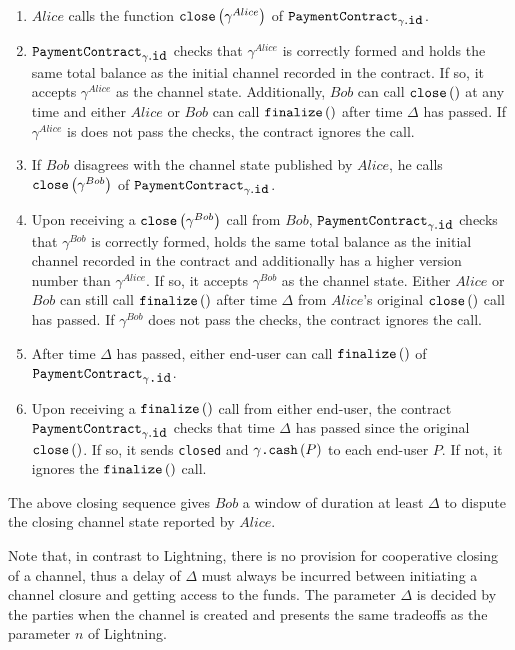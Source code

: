   \begin{enumerate}
    \item $Alice$ calls the function $\mbox{\texttt{close}}\left(\gamma^{Alice}\right)$ of
    $\mbox{\texttt{PaymentContract}}_{\gamma\mbox{.\texttt{id}}}$.
    \item $\mbox{\texttt{PaymentContract}}_{\gamma\mbox{.\texttt{id}}}$ checks that
    $\gamma^{Alice}$ is correctly formed and holds the same total balance as the initial
    channel recorded in the contract. If so, it accepts $\gamma^{Alice}$ as the channel
    state. Additionally, $Bob$ can call $\mbox{\texttt{close}}\left(\right)$ at any time
    and either $Alice$ or $Bob$ can call $\mbox{\texttt{finalize}}\left(\right)$ after
    time $\Delta$ has passed. If $\gamma^{Alice}$ is does not pass the checks, the
    contract ignores the call.
    \item If $Bob$ disagrees with the channel state published by $Alice$, he calls
    $\mbox{\texttt{close}}\left(\gamma^{Bob}\right)$ of
    $\mbox{\texttt{PaymentContract}}_{\gamma\mbox{.\texttt{id}}}$.
    \item Upon receiving a $\mbox{\texttt{close}}\left(\gamma^{Bob}\right)$ call from
    $Bob$, $\mbox{\texttt{PaymentContract}}_{\gamma\mbox{.\texttt{id}}}$ checks that
    $\gamma^{Bob}$ is correctly formed, holds the same total balance as the initial
    channel recorded in the contract and additionally has a higher version number than
    $\gamma^{Alice}$. If so, it accepts $\gamma^{Bob}$ as the channel state. Either
    $Alice$ or $Bob$ can still call $\mbox{\texttt{finalize}}\left(\right)$ after time
    $\Delta$ from $Alice$'s original $\mbox{\texttt{close}}\left(\right)$ call has passed.
    If $\gamma^{Bob}$ does not pass the checks, the contract ignores the call.
    \item After time $\Delta$ has passed, either end-user can call
    $\mbox{\texttt{finalize}}\left(\right)$ of
    $\mbox{\texttt{PaymentContract}}_{\gamma\mbox{\texttt{.id}}}$.
    \item Upon receiving a $\mbox{\texttt{finalize}}\left(\right)$ call from either
    end-user, the contract $\mbox{\texttt{PaymentContract}}_{\gamma\mbox{.\texttt{id}}}$
    checks that time $\Delta$ has passed since the original
    $\mbox{\texttt{close}}\left(\right)$. If so, it sends \texttt{closed} and
    $\gamma\mbox{\texttt{.cash}}\left(P\right)$ to each end-user $P$. If not, it ignores
    the $\mbox{\texttt{finalize}}\left(\right)$ call.
  \end{enumerate}

  The above closing sequence gives $Bob$ a window of duration at least $\Delta$ to dispute
  the closing channel state reported by $Alice$.

  Note that, in contrast to Lightning, there is no provision for cooperative closing of a
  channel, thus a delay of $\Delta$ must always be incurred between initiating a channel
  closure and getting access to the funds. The parameter $\Delta$ is decided by the
  parties when the channel is created and presents the same tradeoffs as the parameter $n$
  of Lightning.
